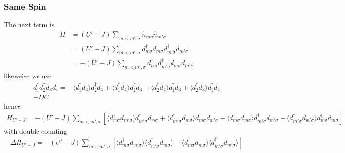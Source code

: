\documentclass[11pt]{article}
\begin{document}
\subsubsection{Same Spin}
The next term is
\begin{align}
    H &= (U'-J) \sum_{m < m', \sigma} \hat n_{m\sigma} \hat n_{m' \sigma} \\\nonumber
    &= (U'-J) \sum_{m < m',\sigma} d^\dagger_{m\sigma}d_{m\sigma}d^\dagger_{m'\sigma}d_{m'\sigma} \\\nonumber
    &= -(U'-J) \sum_{m < m',\sigma} d^\dagger_{m\sigma}d^\dagger_{m'\sigma}d_{m\sigma}d_{m'\sigma}
\end{align}
likeweise we use
\begin{align}
    d^\dagger_1 d^\dagger_2 d_3 d_4 = 
    -\langle d^\dagger_1 d_3 \rangle d^\dagger_2 d_4
    +\langle d^\dagger_1 d_4 \rangle d_2^\dagger d_3
    -\langle d^\dagger_2 d_4 \rangle d^\dagger_1 d_3
    + \langle d^\dagger_2 d_3 \rangle d^\dagger_1 d_4 \\\nonumber
    + DC
\end{align}
hence
\begin{align}
    H_{U'-J} = -(U' - J) \sum_{m < m', \sigma} \left[
        \langle d^\dagger_{m\sigma}d_{m'\sigma} \rangle d^\dagger_{m'\sigma}d_{m\sigma}
        + \langle d^\dagger_{m' \sigma}d_{m\sigma} \rangle d^\dagger_{m\sigma}d_{m'\sigma}
        - \langle d^\dagger_{m\sigma}d_{m\sigma}\rangle d^\dagger_{m'\sigma}d_{m'\sigma}
        - \langle d^\dagger_{m'\sigma}d_{m'\sigma}\rangle d^\dagger_{m\sigma}d_{m\sigma}
    \right]
\end{align}
with double counting
\begin{gather}
    \Delta H_{U'-J} = -(U'-J)\sum_{m < m', \sigma} \left[
         \langle d^\dagger_{m\sigma}d_{m'\sigma} \rangle \langle d^\dagger_{m' \sigma}d_{m\sigma} \rangle
         - \langle d^\dagger_{m\sigma}d_{m\sigma}\rangle \langle d^\dagger_{m'\sigma}d_{m'\sigma}\rangle
        \right]
\end{gather}
\end{document}
